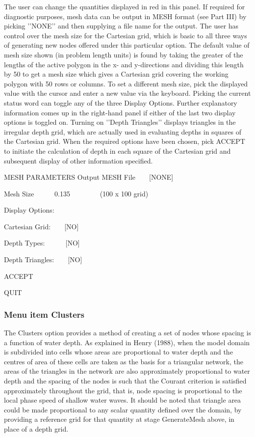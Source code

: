 \documentclass{article}
\begin{document}
The user can change the quantities displayed in red in this panel. If required for diagnostic purposes, mesh data can be output in MESH format (see Part III) by picking '{}'NONE'{}' and then supplying a file name for the output. The user has control over the mesh size for the Cartesian grid, which is basic to all three ways of generating new nodes offered under this particular option. The default value of mesh size shown (in problem length units) is found by taking the greater of the lengths of the active polygon in the x- and y-directions and dividing this length by 50 to get a mesh size which gives a Cartesian grid covering the working polygon with 50 rows or columns. To set a different mesh size, pick the displayed value with the cursor and enter a new value via the keyboard. Picking the current status word can toggle any of the three Display Options. Further explanatory information comes up in the right-hand panel if either of the last two display options is toggled on. Turning on '{}'Depth Triangles'{}' 
displays triangles in the irregular depth grid, which are actually used in evaluating depths in squares of the Cartesian grid. When the required options have been chosen, pick ACCEPT to initiate the calculation of depth in each square of the Cartesian grid and subsequent display of other information specified.

\begin{center}

MESH PARAMETERS\newline
Output MESH File\ \ \ \ [NONE]

Mesh Size\ \ \ \ \ \ 0.135\newline
\ \ \ \ \ \ \ \ (100 x 100 grid)

Display Options:

Cartesian Grid:\ \ \ \ [NO]

Depth Types:\ \ \ \ \ \ [NO]

Depth Triangles:\ \ \ \ [NO]

ACCEPT

QUIT

\end{center}
\subsubsection[Menu item Clusters]{Menu item Clusters}
The Clusters option provides a method of creating a set of nodes whose spacing is a function of water depth. As explained in Henry (1988), when the model domain is subdivided into cells whose areas are proportional to water depth and the centres of area of these cells are taken as the basis for a triangular network, the areas of the triangles in the network are also approximately proportional to water depth and the spacing of the nodes is such that the Courant criterion is satisfied approximately throughout the grid, that is, node spacing is proportional to the local phase speed of shallow water waves. It should be noted that triangle area could be made proportional to any scalar quantity defined over the domain, by providing a reference grid for that quantity at stage GenerateMesh above, in place of a depth grid.
\end{document}
